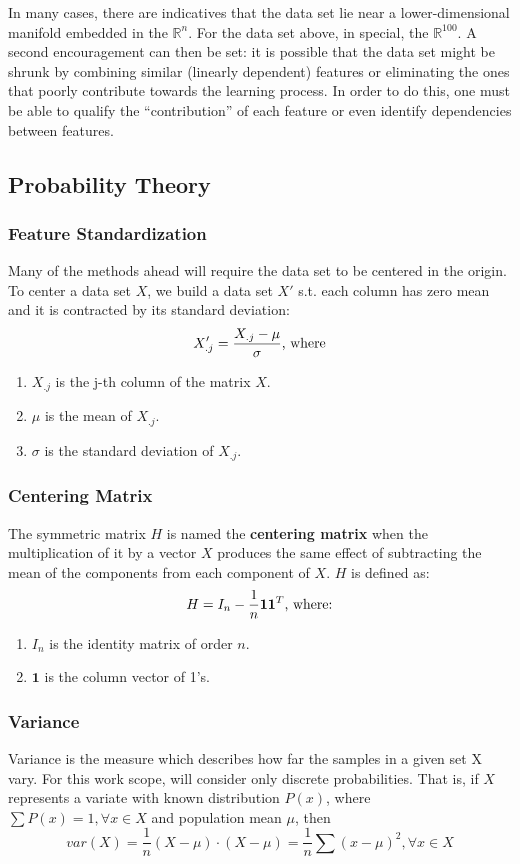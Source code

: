 \documentclass[12pt]{article}
\begin{document}
In many cases, there are indicatives that the data set lie near a lower-dimensional manifold embedded in the $\mathbb{R}^n$. \cite{gho2006} For the data set above, in special, the $\mathbb{R}^{100}$. A second encouragement can then be set: it is possible that the data set might be shrunk by combining similar (linearly dependent) features or eliminating the ones that poorly contribute towards the learning process. In order to do this, one must be able to qualify the “contribution” of each feature or even identify dependencies between features.

\subsection{Probability Theory}
\subsubsection{Feature Standardization}
Many of the methods ahead will require the data set to be centered in the origin. To center a data set $X$, we build a data set $X'$ s.t. each column has zero mean and it is contracted by its standard deviation:
$$X'_{.j} = \frac{X_{.j} - \mu}{\sigma} \textnormal{, where}$$
\begin{enumerate}
	\item $X_{.j}$ is the j-th column of the matrix $X$.
	\item $\mu$ is the mean of $X_{.j}$.
	\item $\sigma$ is the standard deviation of $X_{.j}$.
\end{enumerate}

\subsubsection{Centering Matrix}
The symmetric matrix $H$ is named the \textbf{centering matrix} when the multiplication of it by a vector $X$ produces the same effect of subtracting the mean of the components from each component of $X$. $H$ is defined as:
$$
H = I_n - \frac{1}{n}\textbf{11}^T \textnormal{, where:}
$$
\begin{enumerate}
	\item $I_n$ is the identity matrix of order $n$.
	\item $\textbf{1}$ is the column vector of 1's.
\end{enumerate}

\subsubsection{Variance}
Variance is the measure which describes how far the samples in a given set X vary. For this work scope, will consider only discrete probabilities. That is, if $X$ represents a variate with known distribution $P(x)$, where $\sum P(x) = 1, \forall x \in X$ and population mean $\mu$, then
$$
var(X) = \frac{1}{n} (X-\mu) \cdot (X-\mu) = \frac{1}{n} \sum (x - \mu)^2, \forall x \in X
$$
\end{document}
